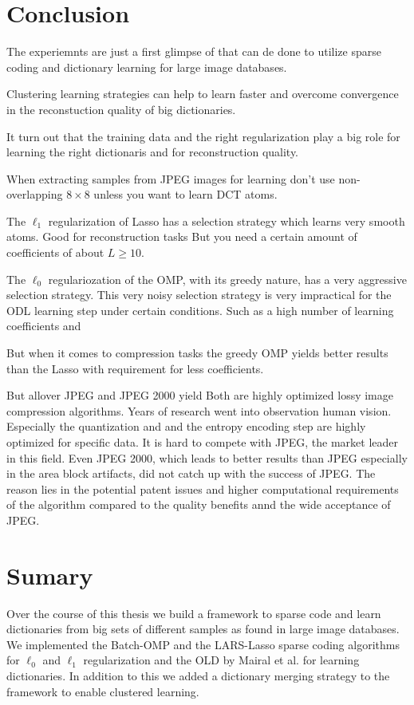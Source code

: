 \section{Conclusion}
The experiemnts are just a first glimpse of that can de done to utilize sparse
coding and dictionary learning for large image databases.


Clustering learning strategies can help to learn faster and overcome
convergence in the reconstuction quality of big dictionaries.


It turn out that the training data and the right 
regularization play a big role for learning the right dictionaris and
for reconstruction quality.

When extracting samples from JPEG images for learning don't use
non-overlapping $8 \times 8$ unless you want to learn DCT atoms. 

The $\ell_1$ regularization of Lasso has a selection strategy
which learns very smooth atoms. Good for reconstruction tasks 
But you need a certain amount of coefficients of about $L \ge 10$.

The $\ell_0$ regulariozation of the OMP, with its greedy nature, has a very
aggressive selection strategy. 
This very noisy selection strategy is very impractical
for the ODL learning step under certain conditions. Such as a high number of
learning coefficients and 

But when it comes to compression tasks the greedy OMP yields better results
than the Lasso with requirement for less coefficients. 

But allover JPEG and JPEG 2000 yield 
Both are highly optimized lossy image compression algorithms. 
Years of research went into observation human vision.  Especially the
quantization and and the entropy encoding step are highly optimized for specific
data. It is hard to compete with JPEG, the market leader in this field.  Even
JPEG 2000, which leads to better results than JPEG especially in the area block
artifacts, did not catch up with the success of JPEG. 
The reason lies in the potential patent issues and higher computational
requirements of the algorithm compared to the quality benefits annd the wide
acceptance of JPEG.



\section{Sumary}
Over the course of this thesis we build a framework to sparse code and learn
dictionaries from big sets of different samples as found in large image
databases. We implemented the Batch-OMP and the LARS-Lasso sparse coding
algorithms for $\ell_0$ and $\ell_1$ regularization and the OLD by Mairal et
al. for learning dictionaries. 
In addition to this we added a dictionary merging strategy to the framework to
enable clustered learning.


